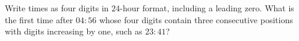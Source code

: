 Write times as four digits in $24$-hour format, including a leading zero. What is the first time after $04{:}56$ whose four digits contain three consecutive positions with digits increasing by one, such as $23{:}41$?
